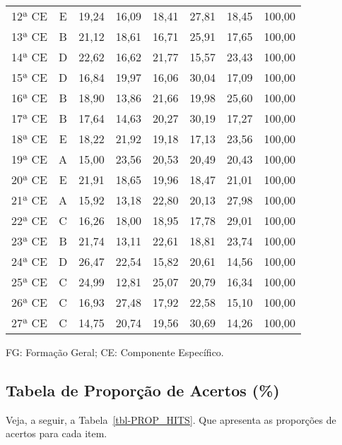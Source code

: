 \documentclass[
  portuguese,
  11pt,
  a4paper,
  DIV=11,
  numbers=noendperiod]{scrreprt}
\begin{document}
\begin{table}
{\begin{tabular*}{\linewidth}{@{\extracolsep{\fill}}cccccccc}
12ª CE & E & 19,24 & 16,09 & 18,41 & 27,81 & 18,45 & 100,00 \\ 
13ª CE & B & 21,12 & 18,61 & 16,71 & 25,91 & 17,65 & 100,00 \\ 
14ª CE & D & 22,62 & 16,62 & 21,77 & 15,57 & 23,43 & 100,00 \\ 
15ª CE & D & 16,84 & 19,97 & 16,06 & 30,04 & 17,09 & 100,00 \\ 
16ª CE & B & 18,90 & 13,86 & 21,66 & 19,98 & 25,60 & 100,00 \\ 
17ª CE & B & 17,64 & 14,63 & 20,27 & 30,19 & 17,27 & 100,00 \\ 
18ª CE & E & 18,22 & 21,92 & 19,18 & 17,13 & 23,56 & 100,00 \\ 
19ª CE & A & 15,00 & 23,56 & 20,53 & 20,49 & 20,43 & 100,00 \\ 
20ª CE & E & 21,91 & 18,65 & 19,96 & 18,47 & 21,01 & 100,00 \\ 
21ª CE & A & 15,92 & 13,18 & 22,80 & 20,13 & 27,98 & 100,00 \\ 
22ª CE & C & 16,26 & 18,00 & 18,95 & 17,78 & 29,01 & 100,00 \\ 
23ª CE & B & 21,74 & 13,11 & 22,61 & 18,81 & 23,74 & 100,00 \\ 
24ª CE & D & 26,47 & 22,54 & 15,82 & 20,61 & 14,56 & 100,00 \\ 
25ª CE & C & 24,99 & 12,81 & 25,07 & 20,79 & 16,34 & 100,00 \\ 
26ª CE & C & 16,93 & 27,48 & 17,92 & 22,58 & 15,10 & 100,00 \\ 
27ª CE & C & 14,75 & 20,74 & 19,56 & 30,69 & 14,26 & 100,00 \\ 
\bottomrule
\end{tabular*}
\begin{minipage}{\linewidth}
FG: Formação Geral; CE: Componente Específico.\\
\end{minipage}

}

\end{table}%

\subsection{Tabela de Proporção de Acertos
(\%)}\label{tabela-de-proporuxe7uxe3o-de-acertos}

Veja, a seguir, a Tabela~\ref{tbl-PROP_HITS}. Que apresenta as
proporções de acertos para cada item.
\end{document}
